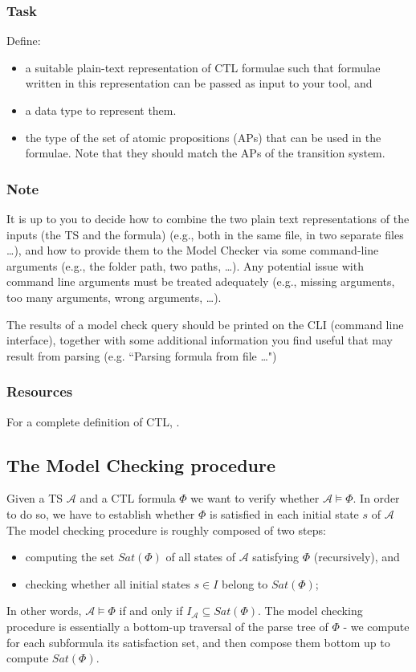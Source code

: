 \documentclass{article}
\begin{document}
\color{red}
\subsubsection*{Task}
Define:
\begin{itemize}
    \item a suitable plain-text representation of CTL formulae such that formulae written in this representation can be passed as input to your tool, and 
    \item a data type to represent them.
    \item the type of the set of atomic propositions (APs) that can be used in the formulae. Note that they should 
            match the APs of the transition system.
\end{itemize}
\color{black}

\subsubsection*{Note}
It is up to you to decide how to combine the two plain text representations of the inputs (the TS and the formula) 
(e.g., both in the same file, in two separate files \dots), 
and how to provide them to the Model Checker via some command-line arguments 
(e.g., the folder path, two paths, \dots). 
Any potential issue with command line arguments must be treated adequately 
(e.g., missing arguments, too many arguments, wrong arguments, \dots).

The results of a model check query should be printed on the CLI (command line interface), 
together with some additional information you find useful that may result from parsing 
(e.g. ``Parsing formula from file \dots")

\subsubsection*{Resources}
For a complete definition of CTL, \cite[Paragraph 6.2 (in particular 6.1.1 and 6.1.2)]{BaKa}.

\subsection{The Model Checking procedure}
\label{subsec:mc}
Given a TS $\mathcal{A}$ and a CTL formula $\Phi$ we want to verify whether $\mathcal{A} \vDash \Phi$.
In order to do so, we have to establish whether $\Phi$ is satisfied in each initial state $s$ of $\mathcal{A}$
The model checking procedure is roughly composed of two steps: 
\begin{itemize}
    \item computing the set $Sat(\Phi)$ of all states of $\mathcal{A}$ satisfying $\Phi$ (recursively), and
    \item checking whether all initial states $s \in I$ belong to $Sat(\Phi)$; 
\end{itemize}
In other words, $\mathcal{A} \vDash \Phi$ if and only if $I_{\mathcal{A}} \subseteq Sat(\Phi)$.
The model checking procedure is essentially a bottom-up traversal of the parse tree of $\Phi$ - we compute
for each subformula its satisfaction set, and then compose them bottom up to compute $Sat(\Phi)$.
\end{document}
